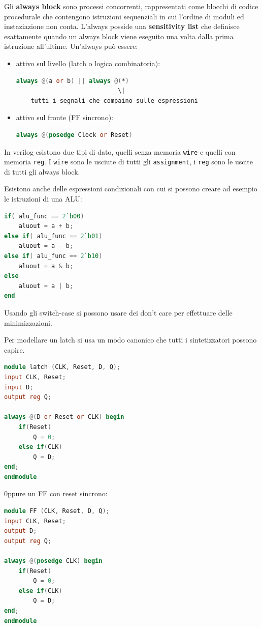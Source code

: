\documentclass[12pt]{article}
\begin{document}
Gli \textbf{always block} sono processi concorrenti, rappresentati come blocchi di codice procedurale che contengono istruzioni sequenziali in cui l'ordine di moduli ed instaziazione non conta. L'always posside una \textbf{sensitivity list} che definisce esattamente quando un always block viene eseguito una volta dalla prima istruzione all'ultime. Un'always pu\`o essere:
\begin{itemize}
    \item attivo sul livello (latch o logica combinatoria):
\begin{lstlisting}[language=verilog]
always @(a or b) || always @(*) 
                            \|
    tutti i segnali che compaino sulle espressioni
\end{lstlisting}

    \item attivo sul fronte (FF sincrono):
\begin{lstlisting}[language=verilog]
always @(posedge Clock or Reset) 
\end{lstlisting}
\end{itemize}

In verilog esistono due tipi di dato, quelli senza memoria \texttt{wire} e quelli con memoria \texttt{reg}. I \texttt{wire} sono le usciute di tutti gli \texttt{assignment}, i \texttt{reg} sono le uscite di tutti gli always block.

Esistono anche delle espressioni condizionali con cui si possono creare ad esempio le istruzioni di una ALU:
\begin{lstlisting}[language=verilog]
if( alu_func == 2`b00)
    aluout = a + b;
else if( alu_func == 2`b01)
    aluout = a - b;
else if( alu_func == 2`b10)
    aluout = a & b;
else
    aluout = a | b;
end
\end{lstlisting}

Usando gli switch-case si possono usare dei don't care per effettuare delle minimizzazioni.

Per modellare un latch si usa un modo canonico che tutti i sintetizzatori possono capire.
\begin{lstlisting}[language=verilog]
module latch (CLK, Reset, D, Q);
input CLK, Reset;
input D;
output reg Q;

always @(D or Reset or CLK) begin
    if(Reset)
        Q = 0;
    else if(CLK)
        Q = D;
end;
endmodule
\end{lstlisting}

0ppure un FF con reset sincrono:
\begin{lstlisting}[language=verilog]
module FF (CLK, Reset, D, Q);
input CLK, Reset;
output D;
output reg Q;

always @(posedge CLK) begin
    if(Reset)
        Q = 0;
    else if(CLK)
        Q = D;
end;
endmodule
\end{lstlisting}
\end{document}
